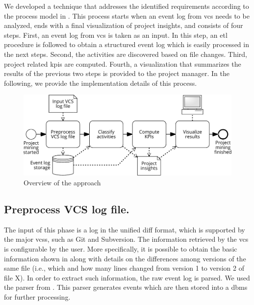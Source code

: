 

We developed a technique that addresses the identified requirements according to the process model in . 
This process starts when an event log from \gls{vcs} needs to be analyzed, ends with a final visualization of project insights, and consists of four steps.
First, an event log from \gls{vcs} is taken as an input. In this step, an \gls{etl} procedure is followed to obtain a structured event log which is easily processed in the next steps. Second, the activities are discovered based on file changes. Third, project related \glspl{kpi} are computed. Fourth, a visualization that summarizes the results of the previous two steps is provided to the project manager. In the following, we provide the implementation details of this process.

\begin{figure}[]
    \centering
    \includegraphics[width=.7\textwidth]{Project-mining-2-Mining-Type-of-Work/figures/overview}
    \caption{Overview of the approach}
    \label{fig:approach-overview}
\end{figure}




\subsection{Preprocess VCS log file.}
The input of this phase is a log in the unified diff format, which is supported
by the major \glspl{vcs}, such as Git and Subversion. The information retrieved by the \gls{vcs} is configurable by the user. More specifically, it is possible to obtain the basic information shown in  along with details on the differences among versions of the same file (i.e., which and how many lines changed from version 1 to version 2 of file X). In order to extract such information, the raw event log is parsed. We used the parser from \cite{DBLP:conf/bpm/BalaRGBMS17}. This parser generates events which are then stored into a \gls{dbms} for further processing. 

